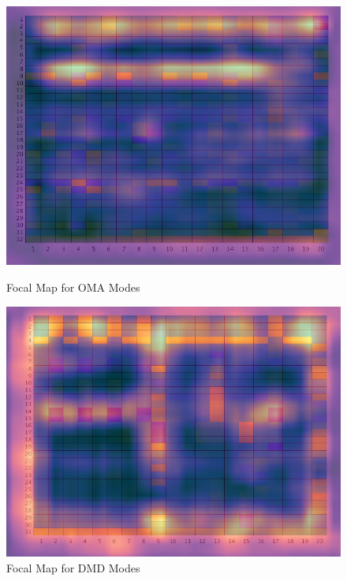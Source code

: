 \begin{figure}[b]
    \centering
    \begin{minipage}{0.45\textwidth}
        \centering
        \includegraphics[scale=0.32]{../../../figures/heatmap_162_OMA.png} %
        \caption{Focal Map for OMA Modes}
        \label{fig:OMA_heat}
    \end{minipage}\hfill
    \begin{minipage}{0.45\textwidth}
        \centering
        \includegraphics[scale=0.32]{../../../figures/heatmap_4_DMD.png} %
        \caption{Focal Map for DMD Modes}
        \label{fig:DMD_heat}
    \end{minipage}
\end{figure}
